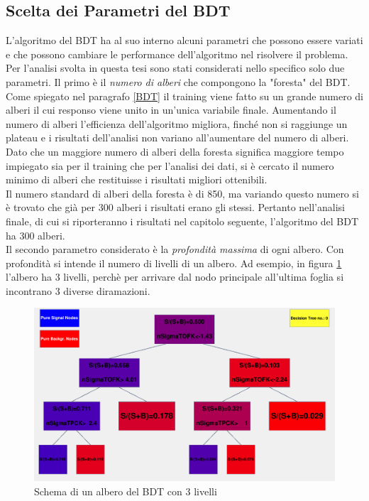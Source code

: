 \subsection{Scelta dei Parametri del BDT}
L'algoritmo del BDT ha al suo interno alcuni parametri che possono essere variati e che possono cambiare le performance dell'algoritmo nel risolvere il problema. Per l'analisi svolta in questa tesi sono stati considerati nello specifico solo due parametri. Il primo è il \textit{numero di alberi} che compongono la "foresta" del BDT. Come spiegato nel paragrafo \ref{BDT}  il training viene fatto su un grande numero di alberi il cui responso viene unito in un'unica variabile finale. Aumentando il numero di alberi l'efficienza dell'algoritmo migliora, finché non si raggiunge un plateau e i risultati dell'analisi non variano all'aumentare del numero di alberi. Dato che un maggiore numero di alberi della foresta significa maggiore tempo impiegato sia per il training che per l'analisi dei dati, si è cercato il numero minimo di alberi che restituisse i risultati migliori ottenibili.
\\Il numero standard di alberi della foresta è di 850, ma variando questo numero si è trovato che già per 300 alberi i risultati erano gli stessi. Pertanto nell'analisi finale, di cui si riporteranno i risultati nel capitolo seguente, l'algoritmo del BDT ha 300 alberi. 
\\Il secondo parametro considerato è la \textit{profondità massima} di ogni albero. Con profondità si intende il numero di livelli di un albero. Ad esempio, in figura \ref{fig:depthBDT} l'albero ha 3 livelli, perchè per arrivare dal nodo principale all'ultima foglia si incontrano 3 diverse diramazioni.
\\
    \begin{figure}[htbp] 
        \centering
        \includegraphics[width=0.7\linewidth]{training&testing/depthBDT.png}
        \caption{Schema di un albero del BDT con 3 livelli}
        \label{fig:depthBDT}
    \end{figure}
    
